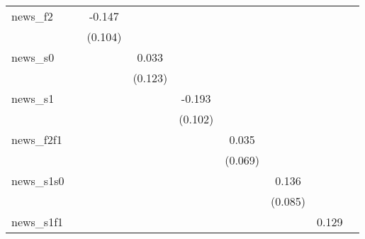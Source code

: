 {\begin{tabular}{l*{8}{c}}
news\_f2     &                     &      -0.147         &                     &                     &                     &                     &                     &                     \\
            &                     &     (0.104)         &                     &                     &                     &                     &                     &                     \\
\addlinespace
news\_s0     &                     &                     &       0.033         &                     &                     &                     &                     &                     \\
            &                     &                     &     (0.123)         &                     &                     &                     &                     &                     \\
\addlinespace
news\_s1     &                     &                     &                     &      -0.193\sym{*}  &                     &                     &                     &                     \\
            &                     &                     &                     &     (0.102)         &                     &                     &                     &                     \\
\addlinespace
news\_f2f1   &                     &                     &                     &                     &       0.035         &                     &                     &                     \\
            &                     &                     &                     &                     &     (0.069)         &                     &                     &                     \\
\addlinespace
news\_s1s0   &                     &                     &                     &                     &                     &       0.136         &                     &                     \\
            &                     &                     &                     &                     &                     &     (0.085)         &                     &                     \\
\addlinespace
news\_s1f1   &                     &                     &                     &                     &                     &                     &       0.129         &                     \\

\end{tabular}}
